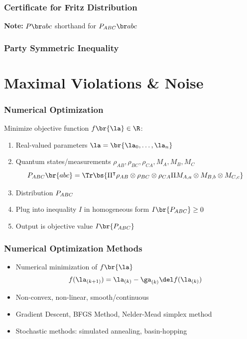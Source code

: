 \documentclass[
    hyperref={bookmarks=false},%
    xcolor={dvipsnames},
]{beamer}
\begin{document}
\begin{frame}
    \frametitle{Certificate for Fritz Distribution}
    
    \vfill
    \textbf{Note:} $\prob[][abc]$ shorthand for $\prob[ABC][abc]$
\end{frame}

\begin{frame}[shrink=60]
    \frametitle{Party Symmetric Inequality}
    
\end{frame}

\section{Maximal Violations \& Noise}

\begin{frame}
    \frametitle{Numerical Optimization}
    Minimize objective function $f\br{\la} \in \R$:
    \begin{enumerate}
        \item Real-valued parameters $\la = \br{\la_0, \ldots, \la_n}$
        \item Quantum states/measurements $\rho_{AB}, \rho_{BC}, \rho_{CA}, M_{A}, M_{B}, M_{C}$
    \[ \prob[ABC]\br{abc} = \Tr\bs{\netperm^\intercal \rho_{AB}\otimes\rho_{BC}\otimes\rho_{CA} \netperm M_{A,a}\otimes M_{B,b} \otimes M_{C,c}} \]
        \item Distribution $\prob[ABC]$
        \item Plug into inequality $I$ in homogeneous form $I\br{\prob[ABC]} \geq 0$
        \item Output is objective value $I\br{\prob[ABC]}$
    \end{enumerate}
\end{frame}

\begin{frame}
    \frametitle{Numerical Optimization Methods}
    \begin{itemize}
        \item Numerical minimization of $f\br{\la}$
        \[ f(\la_{(k+1)}) = \la_{(k)} - \ga_{(k)} \del f(\la_{(k)})  \]
        \item Non-convex, non-linear, smooth/continuous
        \item Gradient Descent, BFGS Method, Nelder-Mead simplex method
        \item Stochastic methods: simulated annealing, basin-hopping
    \end{itemize}
\end{frame}
\end{document}
